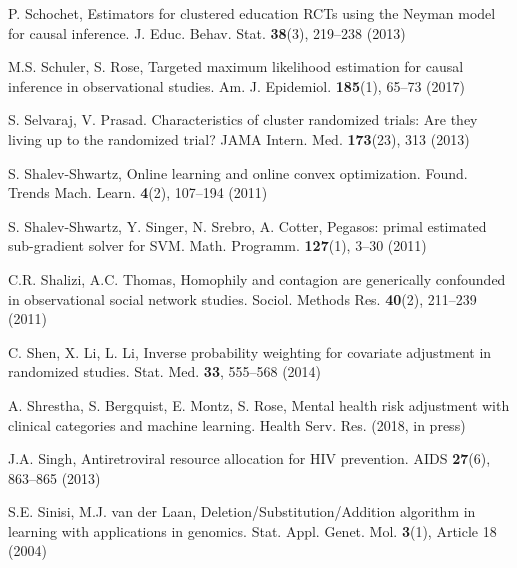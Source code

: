 \begin{list}{}{\setlength{\leftmargin}{2.1em}\setlength{\labelwidth}{0pt}
  \setlength{\labelsep}{0pt}\setlength{\itemindent}{-2.1em}
  \setlength{\parsep}{0pt}\setlength{\itemsep}{2pt}\setlength{\topsep}{0pt}}
\item\label{refentry:REF352}P. Schochet, Estimators for clustered education RCTs using the Neyman model for causal inference. J. Educ. Behav. Stat. \textbf{38}(3), 219--238 (2013)\label{refend:REF352}
\item\label{refentry:REF353}M.S. Schuler, S. Rose, Targeted maximum likelihood estimation for causal inference in observational studies. Am. J. Epidemiol. \textbf{185}(1), 65--73 (2017)\label{refend:REF353}
\item\label{refentry:REF354}S. Selvaraj, V. Prasad. Characteristics of cluster randomized trials: Are they living up to the randomized trial? JAMA Intern. Med. \textbf{173}(23), 313 (2013)\label{refend:REF354}
\item\label{refentry:REF355}S. Shalev-Shwartz, Online learning and online convex optimization. Found. Trends Mach. Learn. \textbf{4}(2), 107--194 (2011)\label{refend:REF355}
\item\label{refentry:REF356}S. Shalev-Shwartz, Y. Singer, N. Srebro, A. Cotter, Pegasos: primal estimated sub-gradient solver for SVM. Math. Programm. \textbf{127}(1), 3--30 (2011)\label{refend:REF356}
\item\label{refentry:REF357}C.R. Shalizi, A.C. Thomas, Homophily and contagion are generically confounded in observational social network studies. Sociol. Methods Res. \textbf{40}(2), 211--239 (2011)\label{refend:REF357}
\item\label{refentry:REF358}C. Shen, X. Li, L. Li, Inverse probability weighting for covariate adjustment in randomized studies. Stat. Med. \textbf{33}, 555--568 (2014)\label{refend:REF358}
\item\label{refentry:REF359}A. Shrestha, S. Bergquist, E. Montz, S. Rose, Mental health risk adjustment with clinical categories and machine learning. Health Serv. Res. (2018, in press)\label{refend:REF359}
\item\label{refentry:REF360}J.A. Singh, Antiretroviral resource allocation for HIV prevention. AIDS \textbf{27}(6), 863--865 (2013)\label{refend:REF360}
\item\label{refentry:REF361}S.E. Sinisi, M.J. van der Laan, Deletion/Substitution/Addition algorithm in learning with applications in genomics. Stat. Appl. Genet. Mol. \textbf{3}(1), Article 18 (2004)\label{refend:REF361}

\end{list}
